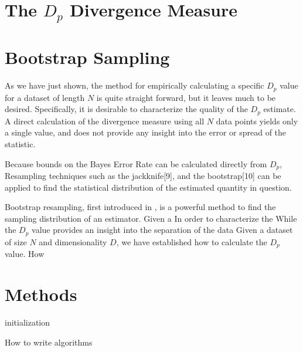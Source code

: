 \documentclass{article}
\begin{document}
	
	
	\section{The $D_p$ Divergence Measure}
	\section{Bootstrap Sampling}
	
	As we have just shown, the method for empirically calculating a specific $D_p$ value for a dataset of length $N$ is quite straight forward, but it leaves much to be desired. Specifically, it is desirable to characterize the quality of the $D_p$ estimate. A direct calculation of the divergence measure using all $N$ data points yields only a single value, and does not provide any insight into the error or spread of  the statistic. 
	
	Because bounds on the Bayes Error Rate can be calculated directly from $D_p$, Resampling techniques such as the jackknife[9], and the bootstrap[10] can be applied to find the statistical distribution of the estimated quantity in question. 
	
	
	
	
	Bootstrap resampling, first introduced in , is a powerful method to find the sampling distribution of an estimator. Given a In order to characterize the 
	While the $D_p$ value provides an insight into the separation of the data   
	Given a dataset of size $N$ and dimensionality $D$, we have established how to calculate the $D_p$ value. How
	
	
	\section{Methods}
	\begin{algorithm}[H]
		initialization\;
	\caption{How to write algorithms}
	\end{algorithm}
	
\end{document}
